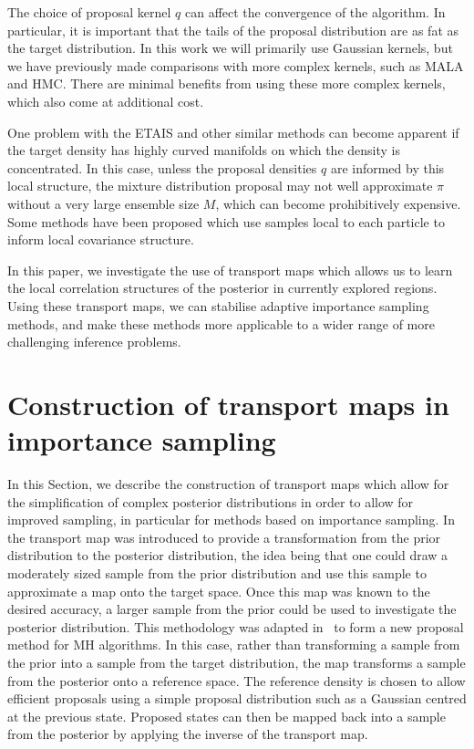 \documentclass[final]{siamltex}
\newcommand{\edit}[1]{{\color{red} #1}}
\begin{document}
\edit{The choice of proposal kernel $q$ can affect the convergence of
  the algorithm. In particular, it is important that the tails of the
  proposal distribution are as fat as the target distribution. In this
  work we will primarily use Gaussian kernels, but we have previously
  made comparisons with more complex kernels, such as MALA and HMC\cite{cotter2015parallel,russ2017parallel}. There are minimal
  benefits from using these more complex kernels, which also come at
  additional cost.}



One problem with the ETAIS and other similar methods can become apparent if
the target density has highly curved manifolds on which the density is
concentrated. In this
case, unless the proposal densities $q$ are informed by this local
structure, the mixture distribution proposal may not well approximate
$\pi$ without a very large ensemble size $M$, which can become
prohibitively expensive. Some methods have been
proposed\cite{douc2007minimum}
which use samples local to each particle to inform local covariance
structure.

\edit{In this paper, we investigate the use of transport maps which allows
us to learn the local correlation structures of the posterior in
currently explored regions. Using these transport maps, we can
stabilise adaptive importance sampling methods, and make these methods
more applicable to a wider range of more challenging inference problems.}

\section{Construction of transport maps in importance sampling} \label{sec:map}
In this Section, we describe the construction of transport maps which
allow for the simplification of complex posterior distributions in
order to allow for improved sampling, in particular for methods based
on importance sampling.
In~\cite{el2012bayesian} the transport map was introduced to provide a transformation from the prior
distribution to the posterior distribution, the idea being that one could draw a moderately sized
sample from the prior distribution and use this sample to approximate a map onto the target space.
Once this map was known to the desired accuracy, a larger sample from the prior could be used to
investigate the posterior distribution. This
methodology was adapted in~\cite{parno2018transport} to form a new proposal method for MH
algorithms. In this case, rather than transforming a sample from the prior into a sample from the target
distribution, the map transforms a sample from the posterior onto a reference space.
The reference density is chosen to allow efficient proposals using a simple proposal
distribution such as a Gaussian centred at the previous state. Proposed states can then be mapped back into a sample from the posterior by applying the inverse of the transport map.
\end{document}
